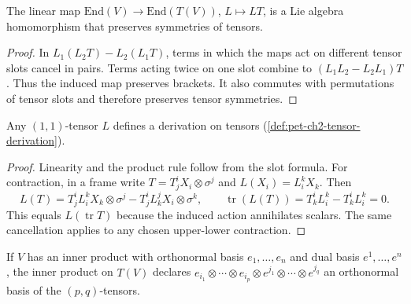 \begin{proposition}
  \label{prop:pet-ch2-endomorphism-lie-algebra-hom}


  The linear map $\mathrm{End}(V)\to\mathrm{End}(T(V))$, $L\mapsto LT$, is a
  Lie algebra homomorphism that preserves symmetries of tensors.
\end{proposition}
\begin{proof}

  \sketch
  In
  $L_1(L_2T)-L_2(L_1T)$, terms in which the maps act on different tensor
  slots cancel in pairs. Terms acting twice on one slot combine to
  $(L_1L_2-L_2L_1)T$. Thus the induced map preserves brackets. It also
  commutes with permutations of tensor slots and therefore preserves tensor
  symmetries.
\end{proof}

\begin{proposition}
  \label{prop:pet-ch2-endomorphism-is-derivation}


  Any $(1,1)$-tensor $L$ defines a derivation on tensors
  (\cref{def:pet-ch2-tensor-derivation}).
\end{proposition}
\begin{proof}

  \sketch
  Linearity and the product
  rule follow from the slot formula. For contraction, in a frame write
  $T=T^i_jX_i\otimes\sigma^j$ and $L(X_i)=L^k_iX_k$. Then
  \[
    L(T)
      =T^i_jL^k_iX_k\otimes\sigma^j
       -T^i_jL^j_kX_i\otimes\sigma^k,
    \qquad
    \operatorname{tr}(L(T))=T^i_kL^k_i-T^i_kL^k_i=0.
  \]
  This equals $L(\operatorname{tr}T)$ because the induced action annihilates
  scalars. The same cancellation applies to any chosen upper-lower
  contraction.
\end{proof}

\begin{definition}
  \label{def:pet-ch2-tensor-algebra-inner-product}


  If $V$ has an inner product with orthonormal basis $e_1,\dots,e_n$ and dual
  basis $e^1,\dots,e^n$, the inner product on $T(V)$ declares
  $e_{i_1}\otimes\cdots\otimes e_{i_p}\otimes e^{j_1}\otimes\cdots\otimes e^{j_q}$
  an orthonormal basis of the $(p,q)$-tensors.
\end{definition}

